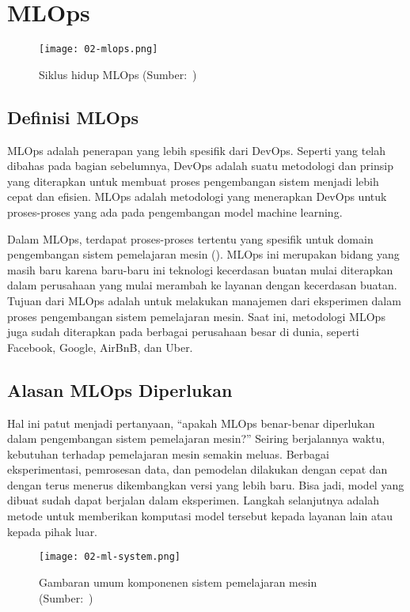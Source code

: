 \section{MLOps}

\begin{figure}[ht]
  \vspace{\baselineskip}
  \centering
  \texttt{[image: 02-mlops.png]}
  \caption{Siklus hidup MLOps (Sumber:~\cite{mlops})}
\end{figure}

\subsection{Definisi MLOps}

MLOps adalah penerapan yang lebih spesifik dari DevOps. 
Seperti yang telah dibahas pada bagian sebelumnya, DevOps adalah suatu metodologi dan prinsip yang diterapkan untuk membuat proses pengembangan sistem menjadi lebih cepat dan efisien.
MLOps adalah metodologi yang menerapkan DevOps untuk proses-proses yang ada pada pengembangan model machine learning.

Dalam MLOps, terdapat proses-proses tertentu yang spesifik untuk domain pengembangan sistem pemelajaran mesin (\cite{mlops}).\@
MLOps ini merupakan bidang yang masih baru karena baru-baru ini teknologi kecerdasan buatan mulai diterapkan dalam perusahaan yang mulai merambah ke layanan dengan kecerdasan buatan.
Tujuan dari MLOps adalah untuk melakukan manajemen dari eksperimen dalam proses pengembangan sistem pemelajaran mesin.
Saat ini, metodologi MLOps juga sudah diterapkan pada berbagai perusahaan besar di dunia, seperti Facebook, Google, AirBnB, dan Uber.

\subsection{Alasan MLOps Diperlukan}

Hal ini patut menjadi pertanyaan, ``apakah MLOps benar-benar diperlukan dalam pengembangan sistem pemelajaran mesin?''
Seiring berjalannya waktu, kebutuhan terhadap pemelajaran mesin semakin meluas.
Berbagai eksperimentasi, pemrosesan data, dan pemodelan dilakukan dengan cepat dan dengan terus menerus dikembangkan versi yang lebih baru.
Bisa jadi, model yang dibuat sudah dapat berjalan dalam eksperimen.
Langkah selanjutnya adalah metode untuk memberikan komputasi model tersebut kepada layanan lain atau kepada pihak luar.

\begin{figure}[ht]
  \vspace{\baselineskip}
  \centering
  \texttt{[image: 02-ml-system.png]}
  \captionsetup{justification=centering}
  \caption{Gambaran umum komponenen sistem pemelajaran mesin (Sumber:~\cite{NIPS2015_86df7dcf})}\label{fig:ml-system}
\end{figure}

